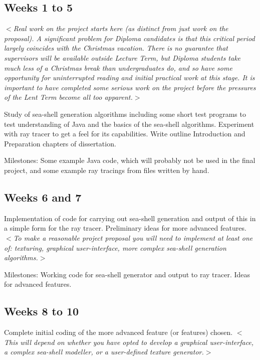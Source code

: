 \documentclass[12pt]{article}
\newcommand{\al}{$<$}
\newcommand{\ar}{$>$}
\begin{document}
\subsection*{Weeks 1 to 5}

\al\emph{Real work on the project starts here (as distinct from just
  work on the proposal).  A significant problem for Diploma candidates
  is that this critical period largely coincides with the Christmas
  vacation.  There is no guarantee that supervisors will be available
  outside Lecture Term, but Diploma students take much less of a
  Christmas break than undergraduates do, and so have some opportunity
  for uninterrupted reading and initial practical work at this stage.
  It is important to have completed some serious work on the project
  before the pressures of the Lent Term become all too apparent.}\ar

Study of sea-shell generation algorithms including some short test
programs to test understanding of Java and the basics of the
sea-shell algorithms.  Experiment with ray tracer to get a feel for
its capabilities.  Write outline Introduction and Preparation chapters
of dissertation.  

Milestones: Some example Java code, which will probably not be
used in the final project, and some example ray tracings from files
written by hand.


\subsection*{Weeks 6 and 7}

Implementation of code for carrying out sea-shell generation and
output of this in a simple form for the ray tracer.  Preliminary ideas
for more advanced features. \al\emph{To make a reasonable project
proposal you will need to implement at least one of: texturing,
graphical user-interface, more complex sea-shell generation
algorithms.}\ar\ 

Milestones: Working code for sea-shell generator and output to ray
tracer.  Ideas for advanced features.


\subsection*{Weeks 8 to 10}

Complete initial coding of the more advanced feature (or features)
chosen. \al\emph{This will depend on whether you have opted to develop a
graphical user-interface, a complex sea-shell modeller, or a
user-defined texture generator.}\ar\ 
\end{document}
